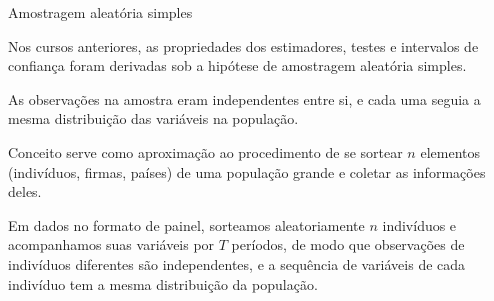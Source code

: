 \documentclass[11pt]{beamer}
\newenvironment{halfwideitemize}{\itemize\addtolength{\itemsep}{0.5em}}{\enditemize}
\begin{document}
	\begin{frame}{Amostragem aleatória simples}
		\begin{halfwideitemize}
			
			\item Nos cursos anteriores, as propriedades dos estimadores, testes e intervalos de confiança foram derivadas sob a hipótese de {\color{blue}amostragem aleatória simples}.
			\begin{halfwideitemize}
				\item As observações na amostra eram independentes entre si, e cada uma seguia a mesma distribuição das variáveis na população.
				\item Conceito serve como aproximação ao procedimento de se sortear $n$ elementos (indivíduos, firmas, países) de uma população grande e coletar as informações deles.
				\item Em dados no formato de painel, sorteamos aleatoriamente $n$ indivíduos e acompanhamos suas variáveis por $T$ períodos, de modo que observações de indivíduos diferentes são independentes, e a sequência de variáveis de cada indivíduo tem a mesma distribuição da população.
			\end{halfwideitemize}
		\end{halfwideitemize}
	\end{frame}
	
\end{document}
